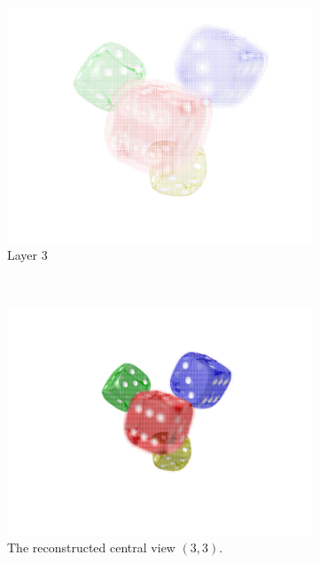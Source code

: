 \documentclass[11pt,a4paper,titlepage]{article}
\begin{document}
\begin{figure}[h]
\begin{subfigure}[c]{0.3\textwidth}
		\includegraphics[width=\textwidth]{results/dice_perspective_rec_3Layers_r=1/3.png}
		\caption{Layer 3}
	\end{subfigure}%
	\\
	\begin{subfigure}[t]{0.4\textwidth}
		\includegraphics[width=\textwidth]{results/dice_perspective_rec_3Layers_r=1/central_view_reconstruction.png}
		\caption{The reconstructed central view $\left( 3, 3 \right)$.}
	\end{subfigure}%
	~
	\begin{subfigure}[t]{0.4\textwidth}

\end{subfigure}
\end{figure}
\end{document}
